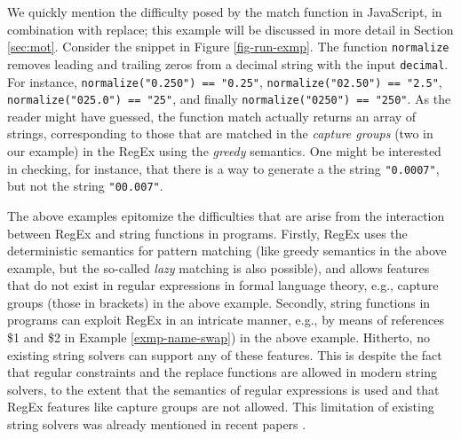 \begin{example}\label{ex:normalize}
    We quickly mention the difficulty posed by the match function in JavaScript,
    in combination with replace; this example will be discussed in more
    detail in Section \ref{sec:mot}. Consider the snippet in Figure 
    \ref{fig-run-exmp}.
 The function {\tt normalize}   removes leading and trailing zeros from a decimal string with the input %
{\tt decimal}. For instance, 
 \texttt{normalize("0.250") == "0.25"},
 \texttt{normalize("02.50") == "2.5"},
 \texttt{normalize("025.0") == "25"},
and finally  \texttt{normalize("0250") == "250"}. As the reader might have
    guessed, the function match actually returns an array of strings,
    corresponding to those that are matched in the \emph{capture groups} (two 
    in our example) in the RegEx using the \emph{greedy} semantics. One might be
    interested in checking, for instance, that there is a way to generate a
    the string \texttt{"0.0007"}, but not the string \texttt{"00.007"}.
\end{example}



The above examples epitomize the difficulties that are arise from the
interaction between RegEx and string functions in programs. Firstly,
RegEx uses the deterministic semantics for pattern matching (like greedy
semantics in the above example, but the so-called \emph{lazy} matching is
also possible), and allows features that do not exist in regular expressions in
formal language theory, e.g., capture groups (those in brackets) in the above
example. Secondly, string functions in programs can exploit RegEx in an
intricate manner, e.g., by means of references \$1 and \$2 in Example 
\ref{exmp-name-swap}) in the above example. Hitherto, no existing string solvers
can support any of these features. This is despite the fact that regular 
constraints and the replace functions are allowed in modern string solvers, 
to the extent that the semantics of regular expressions is used and that 
RegEx features like capture groups are not allowed. This limitation of existing
string solvers was already mentioned in recent papers \cite{aratha,LMK19}.

